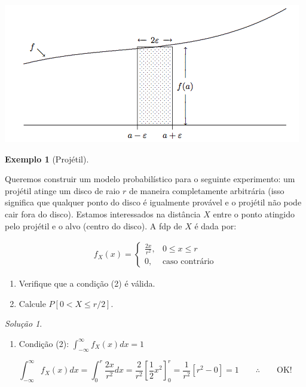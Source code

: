 \documentclass[
]{book}
\providecommand{\tightlist}{%
  \setlength{\itemsep}{0pt}\setlength{\parskip}{0pt}}
\theoremstyle{definition}
\theoremstyle{definition}
\newtheorem{example}{Exemplo}[chapter]
\theoremstyle{definition}
\theoremstyle{remark}
\newtheorem*{solution}{Solução}
\begin{document}
\includegraphics[width=0.6\linewidth]{img/fdp-cont-2}

\begin{example}[Projétil]
\protect\hypertarget{exm:unnamed-chunk-7}{}{\label{exm:unnamed-chunk-7} {} }
\end{example}

Queremos construir um modelo probabilístico para o seguinte experimento:
um projétil atinge um disco de raio \(r\) de maneira completamente arbitrária (isso significa que qualquer ponto do disco é igualmente provável e o projétil não pode cair fora do disco). Estamos interessados na distância \(X\) entre o ponto atingido pelo projétil e o alvo (centro do disco). A fdp de \(X\) é dada por:

\begin{align*}
  f_X(x) = 
  \left\{
  \begin{array}{ll}
    \frac{2x}{r^2}, & 0 \leq x \leq r \\
    0, & \text{caso contrário}
  \end{array} 
  \right.
\end{align*}

\begin{enumerate}
\def\labelenumi{\arabic{enumi}.}
\tightlist
\item
  Verifique que a condição (2) é válida.\\
\item
  Calcule \(P[0 < X \leq r/2]\).
\end{enumerate}

\begin{solution}
{}
\end{solution}

\begin{enumerate}
\def\labelenumi{\arabic{enumi}.}
\tightlist
\item
  Condição (2): \(\int_{-\infty}^{\infty} f_X(x) dx = 1\)
\end{enumerate}

\[\int_{-\infty}^{\infty} f_X(x) dx = \int_{0}^{r} \frac{2x}{r^2} dx = \frac{2}{r^2}\left[\frac{1}{2}x^2\right]_{0}^{r} = \frac{1}{r^2} [r^2 - 0] = 1  \qquad \therefore \qquad \text{OK!}\]
\end{document}
